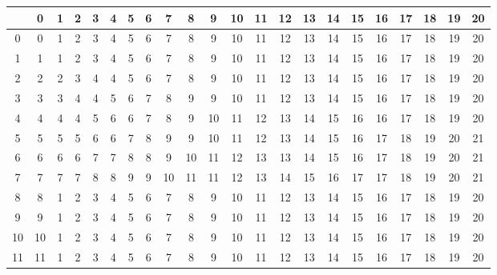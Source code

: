 \documentclass[10pt]{article}
\begin{document}
\pagestyle{empty}

\setlength\extrarowheight{5pt}

\begin{table}[ht]
  \centering
  \begin{tabular}{c|ccc|ccc|ccc|ccc|ccc|ccc|ccc}
    \hline
      & 0 & 1 & 2 & 3 & 4 & 5 & 6 & 7 & 8 & 9 & 10 & 11 & 12 & 13 & 14 & 15 & 16 & 17 & 18 & 19 & 20\\\hline

    \rowcolor{LightCyan}
    0 & 0 & 1 & 2 & 3 & 4 & 5 & 6 & 7 & 8 & 9 & 10 & 11 & 12 & 13 & 14 & 15 & 16 & 17 & 18 & 19 & 20\\
    \rowcolor{LightCyan}
    1 & 1 & 1 & 2 & 3 & 4 & 5 & 6 & 7 & 8 & 9 & 10 & 11 & 12 & 13 & 14 & 15 & 16 & 17 & 18 & 19 & 20\\
    \rowcolor{LightCyan}
    2 & 2 & 2 & 3 & 4 & 4 & 5 & 6 & 7 & 8 & 9 & 10 & 11 & 12 & 13 & 14 & 15 & 16 & 17 & 18 & 19 & 20\\

    3 & 3 & 3 & 4 & 4 & 5 & 6 & 7 & 8 & 9 & 9 & 10 & 11 & 12 & 13 & 14 & 15 & 16 & 17 & 18 & 19 & 20\\
    4 & 4 & 4 & 4 & 5 & 6 & 6 & 7 & 8 & 9 & 10 & 11 & 12 & 13 & 14 & 15 & 16 & 16 & 17 & 18 & 19 & 20\\
    5 & 5 & 5 & 5 & 6 & 6 & 7 & 8 & 9 & 9 & 10 & 11 & 12 & 13 & 14 & 15 & 16 & 17 & 18 & 19 & 20 & 21\\

    \rowcolor{LightCyan}
    6 & 6 & 6 & 6 & 7 & 7 & 8 & 8 & 9 & 10 & 11 & 12 & 13 & 13 & 14 & 15 & 16 & 17 & 18 & 19 & 20 & 21\\
    \rowcolor{LightCyan}
    7 & 7 & 7 & 7 & 8 & 8 & 9 & 9 & 10 & 11 & 11 & 12 & 13 & 14 & 15 & 16 & 17 & 17 & 18 & 19 & 20 & 21\\
    \rowcolor{LightCyan}
    8 & 8 & 1 & 2 & 3 & 4 & 5 & 6 & 7 & 8 & 9 & 10 & 11 & 12 & 13 & 14 & 15 & 16 & 17 & 18 & 19 & 20\\

    9 & 9 & 1 & 2 & 3 & 4 & 5 & 6 & 7 & 8 & 9 & 10 & 11 & 12 & 13 & 14 & 15 & 16 & 17 & 18 & 19 & 20\\
    10 & 10 & 1 & 2 & 3 & 4 & 5 & 6 & 7 & 8 & 9 & 10 & 11 & 12 & 13 & 14 & 15 & 16 & 17 & 18 & 19 & 20\\
    11 & 11 & 1 & 2 & 3 & 4 & 5 & 6 & 7 & 8 & 9 & 10 & 11 & 12 & 13 & 14 & 15 & 16 & 17 & 18 & 19 & 20\\


\end{tabular}
\end{table}
\end{document}
